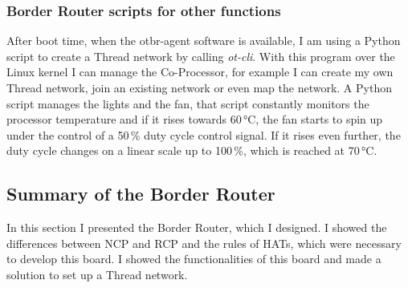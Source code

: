 \subsubsection{Border Router scripts for other functions}
After boot time, when the otbr-agent software is available, I am using a Python script to create a Thread network by calling \textit{ot-cli}. With this program over the Linux kernel I can manage the Co-Processor, for example I can create my own Thread network, join an existing network or even map the network. A Python script manages the lights and the fan, that script constantly monitors the processor temperature and if it rises towards 60\,\si{\celsius}, the fan starts to spin up under the control of a 50\,\% duty cycle control signal. If it rises even further, the duty cycle changes on a linear scale up to 100\,\%, which is reached at 70\,\si{\celsius}.

\subsection{Summary of the Border Router}
In this section I presented the Border Router, which I designed. I showed the differences between NCP and RCP and the rules of HATs, which were necessary to develop this board. I showed the functionalities of this board and made a solution to set up a Thread network.
